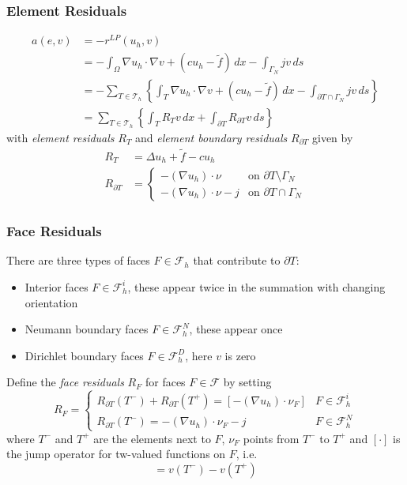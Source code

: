 \documentclass[ignorenonframetext,11pt]{beamer}
\theoremstyle{definition}
\begin{document}
\begin{frame}
\frametitle{Element Residuals}
\begin{align*}
  a(e,v) &= - r^{LP}(u_h,v) \\
  &= - \int_\Omega \nabla u_h \cdot \nabla v + (c u_h - \tilde{f})\,dx - \int_{\Gamma_N} jv\,ds \\
  &= - \sum_{T \in \mathcal{T}_h} \left\{ \int_T \nabla u_h \cdot \nabla v + (c u_h - \tilde{f})\,dx - \int_{\partial T \cap \Gamma_N} jv\,ds \right\} \\
  &= \sum_{T \in \mathcal{T}_h} \left\{ \int_T R_T v \,dx + \int_{\partial T} R_{\partial T} v \,ds \right\}
\end{align*}
with \emph{element residuals} $R_T$ and \emph{element boundary residuals} $R_{\partial T}$ given by
\begin{align*}
  R_T &= \Delta u_h + \tilde{f} - c u_h \\
  R_{\partial T} &= \begin{cases} - (\nabla u_h) \cdot \nu & \text{on } \partial T \setminus \Gamma_N \\
    -(\nabla u_h) \cdot \nu - j & \text{on } \partial T \cap \Gamma_N \end{cases}
\end{align*}
\end{frame}

\begin{frame}
\frametitle{Face Residuals}
There are three types of faces $F \in \mathcal{F}_h$ that contribute to $\partial T$:
\begin{itemize}
  \item Interior faces $F \in \mathcal{F}_h^i$, these appear twice in the summation with changing orientation
  \item Neumann boundary faces $F \in \mathcal{F}_h^N$, these appear once
  \item Dirichlet boundary faces $F \in \mathcal{F}_h^D$, here $v$ is zero
\end{itemize}

Define the \emph{face residuals} $R_F$ for faces $F \in \mathcal{F}$ by setting
\begin{equation*}
  R_F = \begin{cases} R_{\partial T}(T^-) + R_{\partial T}(T^+) = [- (\nabla u_h) \cdot \nu_F] & F \in \mathcal{F}_h^i \\
    R_{\partial T}(T^-) = - (\nabla u_h) \cdot \nu_F - j & F \in \mathcal{F}_h^N \end{cases}
\end{equation*}
where $T^-$ and $T^+$ are the elements next to $F$, $\nu_F$ points from $T^-$ to $T^+$ and $[\cdot]$ is the jump operator for tw-valued functions on $F$, i.e.
\begin{equation*}
  [v] = v(T^-) - v(T^+)
\end{equation*}
\end{frame}
\end{document}
